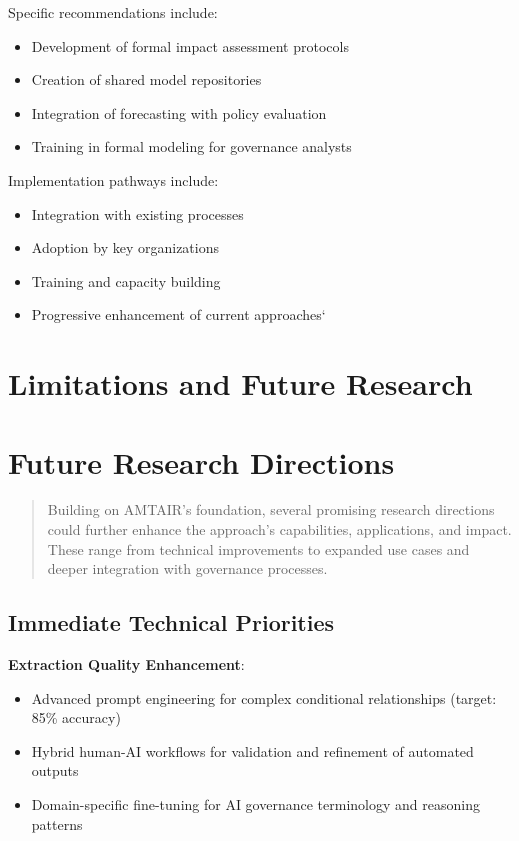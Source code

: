 \documentclass[
  11pt,
  letterpaper,
]{book}
\providecommand{\tightlist}{%
  \setlength{\itemsep}{0pt}\setlength{\parskip}{0pt}}
\begin{document}
Specific recommendations include:

\begin{itemize}
\tightlist
\item
  Development of formal impact assessment protocols
\item
  Creation of shared model repositories
\item
  Integration of forecasting with policy evaluation
\item
  Training in formal modeling for governance analysts
\end{itemize}

Implementation pathways include:

\begin{itemize}
\tightlist
\item
  Integration with existing processes
\item
  Adoption by key organizations
\item
  Training and capacity building
\item
  Progressive enhancement of current approaches`
\end{itemize}

\section{Limitations and Future Research}\label{sec-future-research3}

\section{Future Research Directions}\label{future-research-directions}

\begin{quote}
Building on AMTAIR's foundation, several promising research directions
could further enhance the approach's capabilities, applications, and
impact. These range from technical improvements to expanded use cases
and deeper integration with governance processes.
\end{quote}

\subsection{Immediate Technical
Priorities}\label{sec-technical-priorities2}

\textbf{Extraction Quality Enhancement}:

\begin{itemize}
\tightlist
\item
  Advanced prompt engineering for complex conditional relationships
  (target: 85\% accuracy)
\item
  Hybrid human-AI workflows for validation and refinement of automated
  outputs
\item
  Domain-specific fine-tuning for AI governance terminology and
  reasoning patterns
\end{itemize}
\end{document}

